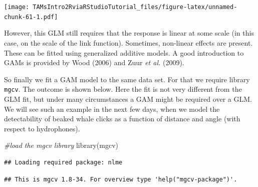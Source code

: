 \documentclass[
]{article}
\newenvironment{Shaded}{\begin{snugshade}}{\end{snugshade}}
\newcommand{\AttributeTok}[1]{\textcolor[rgb]{0.77,0.63,0.00}{#1}}
\newcommand{\CommentTok}[1]{\textcolor[rgb]{0.56,0.35,0.01}{\textit{#1}}}
\newcommand{\DecValTok}[1]{\textcolor[rgb]{0.00,0.00,0.81}{#1}}
\newcommand{\FunctionTok}[1]{\textcolor[rgb]{0.00,0.00,0.00}{#1}}
\newcommand{\NormalTok}[1]{#1}
\newcommand{\SpecialCharTok}[1]{\textcolor[rgb]{0.00,0.00,0.00}{#1}}
\newcommand{\StringTok}[1]{\textcolor[rgb]{0.31,0.60,0.02}{#1}}
\begin{document}
\begin{Shaded}
\end{Shaded}

\texttt{[image: TAMsIntro2RviaRStudioTutorial\_files/figure-latex/unnamed-chunk-61-1.pdf]}

However, this GLM still requires that the response is linear at some
scale (in this case, on the scale of the link function). Sometimes,
non-linear effects are present. These can be fitted using generalized
additive models. A good introduction to GAMs is provided by Wood (2006)
and Zuur \emph{et al.} (2009).

So finally we fit a GAM model to the same data set. For that we require
library \texttt{mgcv}. The outcome is shown below. Here the fit is not
very different from the GLM fit, but under many circumstances a GAM
might be required over a GLM. We will see such an example in the next
few days, when we model the detectability of beaked whale clicks as a
function of distance and angle (with respect to hydrophones).

\begin{Shaded}
\begin{Highlighting}[]
\CommentTok{\#load the mgcv library}
\FunctionTok{library}\NormalTok{(mgcv)}
\end{Highlighting}
\end{Shaded}

\begin{verbatim}
## Loading required package: nlme
\end{verbatim}

\begin{verbatim}
## This is mgcv 1.8-34. For overview type 'help("mgcv-package")'.
\end{verbatim}
\end{document}

